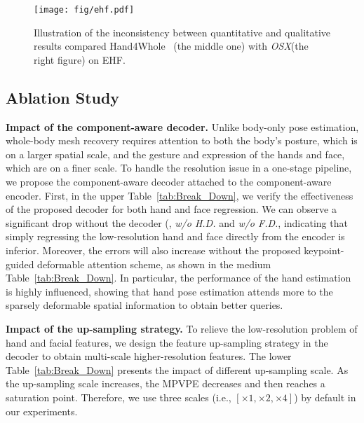 \documentclass[10pt,twocolumn,letterpaper]{article}
\newcommand{\modelname}{\emph{OSX}\xspace}
\begin{document}
\begin{figure}[t]
\vspace{-0.2cm}
\begin{center}
\texttt{[image: fig/ehf.pdf]}
\end{center}
\vspace{-0.4cm}
\caption{
Illustration of the inconsistency between quantitative and qualitative results compared Hand4Whole~\cite{GyeongsikMoon2020hand4whole} (the middle one) with \modelname (the right figure) on EHF.
}
\vspace{-0.6cm}
\label{fig:vis_ehf}
\end{figure}
 
\subsection{Ablation Study}
\vspace{-0.1cm}
\noindent \textbf{Impact of the component-aware decoder.}
Unlike body-only pose estimation, whole-body mesh recovery requires attention to both the body's posture, which is on a larger spatial scale, and the gesture and expression of the hands and face, which are on a finer scale. To handle the resolution issue in a one-stage pipeline, we propose the component-aware decoder attached to the component-aware encoder.
First, in the upper Table~\ref{tab:Break_Down}, we verify the effectiveness of the proposed decoder for both hand and face regression. We can observe a significant drop without the decoder (\eg, \emph{w/o H.D.} and \emph{w/o F.D.}, indicating that simply regressing the low-resolution hand and face directly from the encoder is inferior. 
Moreover, the errors will also increase without the proposed keypoint-guided deformable attention scheme, as shown in the medium Table~\ref{tab:Break_Down}. In particular, the performance of the hand estimation is highly influenced, showing that hand pose estimation attends more to the sparsely deformable spatial information to obtain better queries.

\noindent \textbf{Impact of the up-sampling strategy.}
To relieve the low-resolution problem of hand and facial features, we design the feature up-sampling strategy in the decoder to obtain multi-scale higher-resolution features. 
The lower Table~\ref{tab:Break_Down} presents the impact of different up-sampling  scale. 
As the up-sampling scale increases, the MPVPE decreases and then reaches a saturation point. Therefore, we use three scales (i.e., $[\times 1, \times 2, \times 4]$) by default in our experiments.
\end{document}
